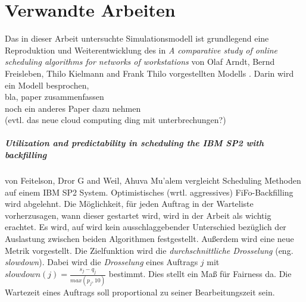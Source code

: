 \chapter{Verwandte Arbeiten}
\label{chap:related_work}
Das in dieser Arbeit untersuchte Simulationsmodell ist grundlegend eine Reproduktion und Weiterentwicklung des in 
\emph{A comparative study of online scheduling algorithms for networks
of workstations}
von Olaf Arndt, Bernd Freisleben, Thilo Kielmann and Frank Thilo vorgestellten Modells \cite{Arn99}.
Darin wird ein Modell besprochen, \\
bla, paper zusammenfassen\\
noch ein anderes Paper dazu nehmen\\
(evtl. das neue cloud computing ding mit unterbrechungen?)



\paragraph{Utilization and predictability in scheduling the IBM SP2 with backfilling}
von Feitelson, Dror G and Weil, Ahuva Mu'alem \cite{optVsCons} vergleicht Scheduling Methoden auf einem IBM SP2 System. Optimistisches (wrtl. aggressives) FiFo-Backfilling wird abgelehnt. Die Möglichkeit, für jeden Auftrag in der Warteliste vorherzusagen, wann dieser gestartet wird, wird in der Arbeit als wichtig erachtet. Es wird, auf wird kein ausschlaggebender Unterschied bezüglich der Auslastung zwischen beiden Algorithmen festgestellt. Außerdem wird eine neue Metrik vorgestellt.
Die Zielfunktion wird die \emph{durchschnittliche Drosselung} (eng. \emph{slowdown}). Dabei wird die \emph{Drosselung} eines Auftrags $j$ mit $slowdown(j) = \frac{s_j - q_j}{max(p_j,10)}$ bestimmt. Dies stellt ein Maß für Fairness da. Die Wartezeit eines Auftrags soll proportional zu seiner Bearbeitungszeit sein.


